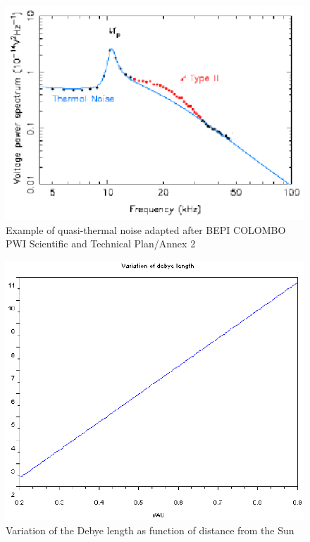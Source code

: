 \documentclass[a4paper,twocolumn]{esapub2005} %
\begin{document}
\begin{figure}
\centering
\includegraphics[width=1.0\linewidth]{paperpics/qtn.eps}
\caption{Example of quasi-thermal noise adapted after BEPI COLOMBO PWI Scientific and Technical Plan/Annex 2} \label{fig:qtn}
\end{figure}


\begin{figure}
\centering
\includegraphics[width=1.0\linewidth]{paperpics/debye.eps}
\caption{Variation of the Debye length as function of distance from the Sun} \label{fig:debye}
\end{figure}
\end{document}
